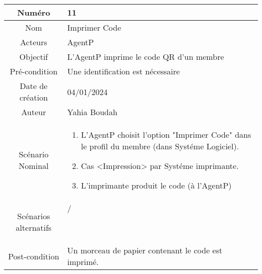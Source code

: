 



\begin{tabular}{ |c|p{12cm}| }
    \hline
    Numéro & 11 \\
    \hline
    Nom & Imprimer Code \\
    \hline
    Acteurs & AgentP \\ 
    \hline
    Objectif & L'AgentP imprime le code QR d'un membre \\ 
    \hline
    Pré-condition & Une identification est nécessaire \\
    \hline
    Date de création & 04/01/2024 \\
    \hline
    Auteur & Yahia Boudah \\
    \hline
    Scénario Nominal & \begin{enumerate}
        \item L'AgentP choisit l'option "Imprimer Code" dans le profil du membre (dans Systéme Logiciel).
        \item Cas <Impression> par Systéme imprimante.
        \item L'imprimante produit le code (à l'AgentP)
    \end{enumerate} \\
    \hline
    Scénarios alternatifs & \begin{description}
        \item[/]
    \end{description} \\
    \hline
    Post-condition & Un morceau de papier contenant le code est imprimé. \\
    \hline
\end{tabular}